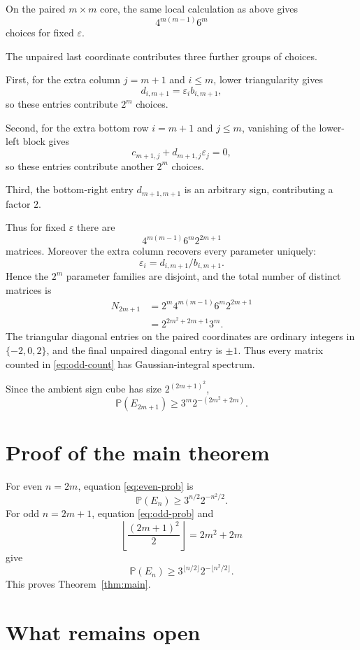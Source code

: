 \documentclass[11pt]{article}
\theoremstyle{remark}
\newcommand{\Pp}{\mathbb P}
\begin{document}
On the paired $m\times m$ core, the same local calculation as above gives
\[
 4^{m(m-1)}6^m
\]
choices for fixed $\varepsilon$.

The unpaired last coordinate contributes three further groups of choices.

First, for the extra column $j=m+1$ and $i\le m$, lower triangularity gives
\[
 d_{i,m+1}=\varepsilon_i b_{i,m+1},
\]
so these entries contribute $2^m$ choices.

Second, for the extra bottom row $i=m+1$ and $j\le m$, vanishing of the lower-left block gives
\[
 c_{m+1,j}+d_{m+1,j}\varepsilon_j=0,
\]
so these entries contribute another $2^m$ choices.

Third, the bottom-right entry $d_{m+1,m+1}$ is an arbitrary sign, contributing a factor $2$.

Thus for fixed $\varepsilon$ there are
\[
 4^{m(m-1)}6^m2^{2m+1}
\]
matrices.  Moreover the extra column recovers every parameter uniquely:
\[
 \varepsilon_i=d_{i,m+1}/b_{i,m+1}.
\]
Hence the $2^m$ parameter families are disjoint, and the total number of distinct matrices is
\begin{align}
 N_{2m+1}
 &=2^m4^{m(m-1)}6^m2^{2m+1}\\
 &=2^{2m^2+2m+1}3^m.                                  \label{eq:odd-count}
\end{align}
The triangular diagonal entries on the paired coordinates are ordinary integers in $\{-2,0,2\}$, and the final unpaired diagonal entry is $\pm1$.  Thus every matrix counted in \eqref{eq:odd-count} has Gaussian-integral spectrum.

Since the ambient sign cube has size $2^{(2m+1)^2}$,
\begin{equation}\label{eq:odd-prob}
 \Pp(E_{2m+1})
 \ge 3^m2^{-(2m^2+2m)}.
\end{equation}

\section{Proof of the main theorem}

For even $n=2m$, equation \eqref{eq:even-prob} is
\[
 \Pp(E_n)\ge 3^{n/2}2^{-n^2/2}.
\]
For odd $n=2m+1$, equation \eqref{eq:odd-prob} and
\[
 \left\lfloor\frac{(2m+1)^2}{2}\right\rfloor=2m^2+2m
\]
give
\[
 \Pp(E_n)\ge3^{\lfloor n/2\rfloor}2^{-\lfloor n^2/2\rfloor}.
\]
This proves Theorem~\ref{thm:main}.

\section{What remains open}
\end{document}
